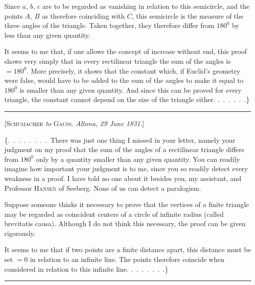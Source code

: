 

%
Since $a$, $b$, $c$ are to be regarded as vanishing in relation to this semicircle, and the points $A$, $B$ as therefore coinciding with $C$, this semicircle is the measure of the three angles of the triangle. Taken together, they therefore differ from $180^0$ by less than any given quantity.

It seems to me that, if one allows the concept of increase without end, this proof shows very simply that in every  rectilinear triangle the sum of the angles is $=180^0$. More precisely, it shows that the constant which, if Euclid's geometry were false, would have to be added to the sum of the angles to make it equal to $180^0$ is smaller than any given quantity. And since this can be proved for every triangle, the constant cannot depend on the size of the triangle either. \mbox{.\ .\ .\ .\ .\ .}\}

\bigskip
\hrule
\bigskip

\begin{center}
[\textsc{Schumacher} \emph{to} \textsc{Gauss}. \emph{Altona, 29 June 1831.}]
\end{center}

\{\mbox{.\ .\ .\ .\ .\ .}\ .\ .\ There was just one thing I missed in your letter, namely your judgment on my proof that the sum of the angles of a rectilinear triangle differs from $180^0$ only by a quantity smaller than any given quantity. You can readily imagine how important your judgment is to me, since you so readily detect every weakness in a proof. I have told no one about it besides you, my assistant, and Professor \textsc{Hansen} of Seeberg. None of us can detect a paralogism.

Suppose someone thinks it necessary to prove that the vertices of a finite triangle may be regarded as coincident centers of a circle of infinite radius (called  brevitatis causa). Although I do not think this necessary, the proof can be given rigorously.

It seems to me that if two points are a finite distance apart, this distance must be set $=0$ in relation to an infinite line. The points therefore coincide when considered in relation to this infinite line. \mbox{.\ .\ .\ .\ .\ .}\ .\}

\bigskip
\hrule
\bigskip

